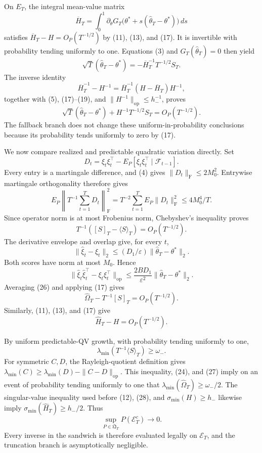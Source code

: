 On \(E_T\), the integral mean-value matrix
\[
 \overline H_T=\int_0^1\partial_\theta G_T
 \bigl(\theta^*+s(\widehat\theta_T-\theta^*)\bigr)\,ds
\tag{18}
\]
satisfies \(\overline H_T-H=O_P(T^{-1/2})\) by (11), (13), and (17). It is invertible with probability tending uniformly to one. Equations (3) and \(G_T(\widehat\theta_T)=0\) then yield
\[
 \sqrt T(\widehat\theta_T-\theta^*)
 =-\overline H_T^{-1}T^{-1/2}S_T.
\tag{19}
\]
The inverse identity
\[
 \overline H_T^{-1}-H^{-1}
 =\overline H_T^{-1}(H-\overline H_T)H^{-1},
\tag{20}
\]
together with (5), (17)--(19), and \(\|H^{-1}\|_{\mathrm{op}}\le h_-^{-1}\), proves
\[
 \sqrt T(\widehat\theta_T-\theta^*)+H^{-1}T^{-1/2}S_T
 =O_P(T^{-1/2}).
\tag{21}
\]
The fallback branch does not change these uniform-in-probability conclusions because its probability tends uniformly to zero by (17).

We now compare realized and predictable quadratic variation directly. Set
\[
 D_t=\xi_t\xi_t^\top-E_P[\xi_t\xi_t^\top\mid\mathcal F_{t-1}].
\tag{22}
\]
Every entry is a martingale difference, and (4) gives \(\|D_t\|_{\mathrm F}\le2M_0^2\). Entrywise martingale orthogonality therefore gives
\[
 E_P\left\|T^{-1}\sum_{t=1}^TD_t\right\|_{\mathrm F}^2
 =T^{-2}\sum_{t=1}^TE_P\|D_t\|_{\mathrm F}^2
 \le4M_0^4/T.
\tag{23}
\]
Since operator norm is at most Frobenius norm, Chebyshev's inequality proves
\[
 T^{-1}([S]_T-\langle S\rangle_T)=O_P(T^{-1/2}).
\tag{24}
\]
The derivative envelope and overlap give, for every \(t\),
\[
 \|\widehat\xi_t-\xi_t\|_2
 \le(D_1/\varepsilon)\|\widehat\theta_T-\theta^*\|_2.
\tag{25}
\]
Both scores have norm at most \(M_0\). Hence
\[
 \|\widehat\xi_t\widehat\xi_t^\top-\xi_t\xi_t^\top\|_{\mathrm{op}}
 \le \frac{2BD_1}{\varepsilon^2}\|\widehat\theta_T-\theta^*\|_2.
\tag{26}
\]
Averaging (26) and applying (17) gives
\[
 \widehat\Omega_T-T^{-1}[S]_T=O_P(T^{-1/2}).
\tag{27}
\]
Similarly, (11), (13), and (17) give
\[
 \widehat H_T-H=O_P(T^{-1/2}).
\tag{28}
\]

By uniform predictable-QV growth, with probability tending uniformly to one,
\[
 \lambda_{\min}(T^{-1}\langle S\rangle_T)\ge\omega_-.
\tag{29}
\]
For symmetric \(C,D\), the Rayleigh-quotient definition gives \(\lambda_{\min}(C)\ge\lambda_{\min}(D)-\|C-D\|_{\mathrm{op}}\). This inequality, (24), and (27) imply on an event of probability tending uniformly to one that \(\lambda_{\min}(\widehat\Omega_T)\ge\omega_-/2\). The singular-value inequality used before (12), (28), and \(\sigma_{\min}(H)\ge h_-\) likewise imply \(\sigma_{\min}(\widehat H_T)\ge h_-/2\). Thus
\[
 \sup_{P\in\mathfrak Q_T}P(\mathcal E_T^c)\longrightarrow0.
\tag{30}
\]
Every inverse in the sandwich is therefore evaluated legally on \(\mathcal E_T\), and the truncation branch is asymptotically negligible.

